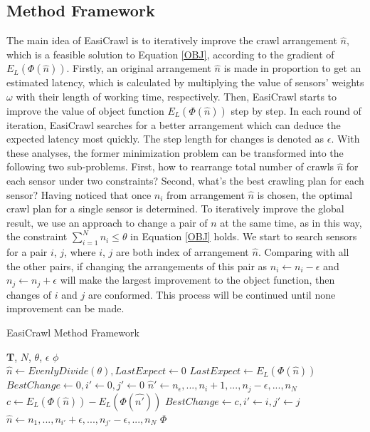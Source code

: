 \documentclass[conference]{IEEEtran}
\begin{document}
\subsection{Method Framework}
The main idea of EasiCrawl is to iteratively improve the crawl arrangement $\hat{n}$, which is a feasible solution to Equation \eqref{OBJ}, according to the gradient of $E_L(\Phi(\hat{n}))$.
Firstly, an original arrangement $\hat{n}$ is made in proportion to get an estimated latency, which is calculated by multiplying the value of sensors' weights $\omega$ with their length of working time, respectively.
Then, EasiCrawl starts to improve the value of object function $E_L(\Phi(\hat{n}))$ step by step. 
In each round of iteration, EasiCrawl searches for a better arrangement which can deduce the expected latency most quickly.
The step length for changes is denoted as $\epsilon$.
With these analyses, the former minimization problem can be transformed into the following two sub-problems.
First, how to rearrange total number of crawls $\hat{n}$ for each sensor under two constraints? 
Second, what's the best crawling plan for each sensor? 
Having noticed that once $n_i$ from arrangement $\hat{n}$ is chosen, the optimal crawl plan for a single sensor is determined. 
To iteratively improve the global result, we use an approach to change a pair of $n$ at the same time, as in this way, the constraint $\sum_{i=1}^{N} n_i \leq\theta$ in Equation \eqref{OBJ} holds.
We start to search sensors for a pair $i$, $j$, where $i$, $j$ are both index of arrangement $\hat{n}$. 
Comparing with all the other pairs, if changing the arrangements of this pair as $n_i\gets n_i-\epsilon$ and $n_j\gets n_j+\epsilon$ will make the largest improvement to the object function, then changes of $i$ and $j$ are conformed.
This process will be continued until none improvement can be made. 

\begin{algorithm}
	\caption{EasiCrawl Method Framework}
	\label{alg:framework}
	\begin{algorithmic}[1]
		\renewcommand{\algorithmicrequire}{\textbf{Input:}}
		\renewcommand{\algorithmicensure}{\textbf{Output:}}
		\REQUIRE $\mathbf{T}$, $N$, $\theta$, $\epsilon$
		\ENSURE  $\phi$
		\\ 
		\STATE $\hat{n}\gets EvenlyDivide(\theta), LastExpect\gets 0$
		\STATE $LastExpect \gets E_L(\Phi(\hat{n}))$
		\STATE $BestChange \gets 0, i'\gets 0, j'\gets 0$		
		\STATE $\hat{n}'\gets n_\epsilon,...,n_i+1,...,n_j-\epsilon,...,n_N$
		\STATE $c\gets E_L(\Phi(\hat{n})) - E_L(\Phi(\hat{n'}))$
		\STATE $BestChange \gets c, i'\gets i, j'\gets j$
		\ENDIF
		\ENDFOR
		\STATE $\hat{n}\gets n_1,...,n_{i'}+\epsilon,...,n_{j'}-\epsilon,...,n_N$
		\ENDWHILE 
		\RETURN $\Phi$
	\end{algorithmic} 
\end{algorithm}
\end{document}
